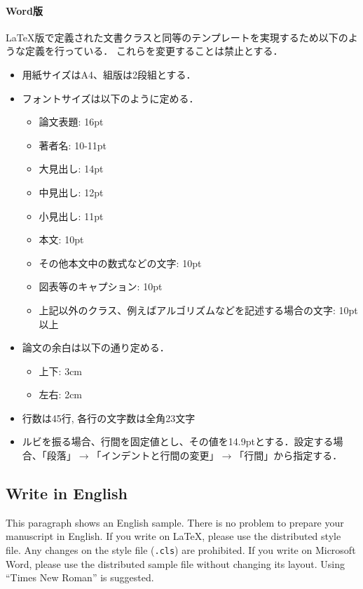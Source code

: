 \documentclass[
  platex, dvipdfmx,  %
]{nlp2021}
\newcommand{\code}[1]{\texttt{#1}}
\begin{document}
\paragraph{Word版}
LaTeX版で定義された文書クラスと同等のテンプレートを実現するため以下のような定義を行っている．
これらを変更することは禁止とする．
\begin{itemize}
    \item 用紙サイズはA4、組版は2段組とする．
    \item フォントサイズは以下のように定める．
    \begin{itemize}
        \item 論文表題: 16pt
        \item 著者名: 10-11pt
        \item 大見出し: 14pt
        \item 中見出し: 12pt
        \item 小見出し: 11pt
        \item 本文: 10pt
        \item その他本文中の数式などの文字: 10pt
        \item 図表等のキャプション: 10pt
        \item 上記以外のクラス、例えばアルゴリズムなどを記述する場合の文字: 10pt以上
    \end{itemize}
    \item 論文の余白は以下の通り定める．
    \begin{itemize}
        \item 上下: 3cm
        \item 左右: 2cm
    \end{itemize}
    \item 行数は45行, 各行の文字数は全角23文字
    \item ルビを振る場合、行間を固定値とし、その値を14.9ptとする．設定する場合、「段落」$\xrightarrow{}$「インデントと行間の変更」$\xrightarrow{}$「行間」から指定する．
\end{itemize}


\subsection{Write in English}
This paragraph shows an English sample.
There is no problem to prepare your manuscript in English.
If you write on LaTeX, please use the distributed style file.
Any changes on the style file (\code{.cls}) are prohibited.
If you write on Microsoft Word, please use the distributed sample file without changing its layout.
Using ``Times New Roman'' is suggested.
\end{document}
